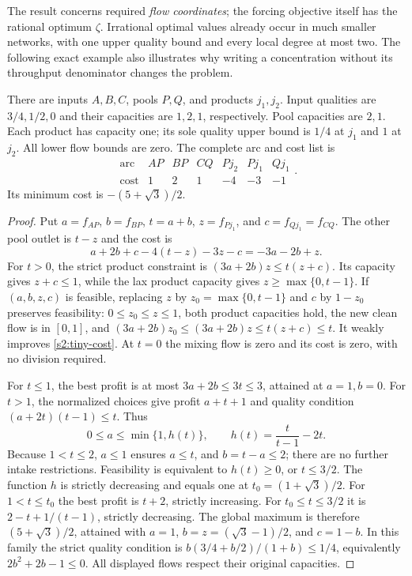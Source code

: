 The result concerns required \emph{flow coordinates}; the forcing
objective itself has the rational optimum $\zeta$. Irrational optimal
values already occur in much smaller networks, with one upper quality
bound and every local degree at most two. The following exact example
also illustrates why writing a concentration without its throughput
denominator changes the problem.

\begin{example}\label{s2:tiny-irrational}
There are inputs $A,B,C$, pools $P,Q$, and products $j_1,j_2$.
Input qualities are $3/4,1/2,0$ and their capacities are $1,2,1$,
respectively. Pool capacities are $2,1$. Each product has capacity one;
its sole quality upper bound is $1/4$ at $j_1$ and $1$ at $j_2$.
All lower flow bounds are zero. The complete arc and cost list is
\[
 \begin{array}{c|rrrrrr}
 \text{arc}&AP&BP&CQ&Pj_2&Pj_1&Qj_1\\ \hline
 \text{cost}&1&2&1&-4&-3&-1
 \end{array}.
\]
Its minimum cost is $-(5+\sqrt3)/2$.
\end{example}
\begin{proof}
Put $a=f_{AP}$, $b=f_{BP}$, $t=a+b$, $z=f_{Pj_1}$, and
$c=f_{Qj_1}=f_{CQ}$. The other pool outlet is $t-z$ and the cost is
\begin{equation}
 a+2b+c-4(t-z)-3z-c=-3a-2b+z.\label{s2:tiny-cost}
\end{equation}
For $t>0$, the strict product constraint is
$(3a+2b)z\le t(z+c)$. Its capacity gives $z+c\le1$,
while the lax product capacity gives $z\ge\max\{0,t-1\}$.
If $(a,b,z,c)$ is feasible, replacing $z$ by
$z_0=\max\{0,t-1\}$ and $c$ by $1-z_0$ preserves feasibility:
$0\le z_0\le z\le1$, both product capacities hold, the new clean
flow is in $[0,1]$, and
$(3a+2b)z_0\le(3a+2b)z\le t(z+c)\le t$.
It weakly improves \eqref{s2:tiny-cost}. At $t=0$ the mixing flow is
zero and its cost is zero, with no division required.

For $t\le1$, the best profit is at most $3a+2b\le3t\le3$,
attained at $a=1,b=0$. For $t>1$, the normalized choices give profit
$a+t+1$ and quality condition
$(a+2t)(t-1)\le t$. Thus
\[
 0\le a\le\min\{1,h(t)\},\qquad
 h(t)=\frac{t}{t-1}-2t.
\]
Because $1<t\le2$, $a\le1$ ensures $a\le t$, and $b=t-a\le2$;
there are no further intake restrictions. Feasibility is equivalent
to $h(t)\ge0$, or $t\le3/2$. The function $h$ is strictly decreasing
and equals one at $t_0=(1+\sqrt3)/2$. For $1<t\le t_0$ the best
profit is $t+2$, strictly increasing. For $t_0\le t\le3/2$ it is
$2-t+1/(t-1)$, strictly decreasing. The global maximum is therefore
$(5+\sqrt3)/2$, attained with
$a=1$, $b=z=(\sqrt3-1)/2$, and $c=1-b$.
In this family the strict quality condition is
$b(3/4+b/2)/(1+b)\le1/4$, equivalently $2b^2+2b-1\le0$.
All displayed flows respect their original capacities.
\end{proof}

